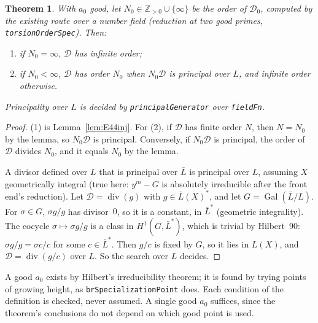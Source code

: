 \documentclass[11pt]{article}
\newtheorem{theorem}{Theorem}[section]
\theoremstyle{definition}
\theoremstyle{remark}
\newcommand{\Z}{\mathbb{Z}}
\newcommand{\code}[1]{\texttt{#1}}
\begin{document}
\begin{theorem}\label{thm:E44tors}
With $a_0$ good, let $N_0\in\Z_{>0}\cup\{\infty\}$ be the order of $\mathcal D_0$,
computed by the existing route over a number field (reduction at two good primes,
\code{torsionOrderSpec}). Then:
\begin{enumerate}
\item if $N_0=\infty$, $\mathcal D$ has infinite order;
\item if $N_0<\infty$, $\mathcal D$ has order $N_0$ when $N_0\mathcal D$ is principal
  over $L$, and infinite order otherwise.
\end{enumerate}
Principality over $L$ is decided by \code{principalGenerator} over \code{fieldFn}.
\end{theorem}
\begin{proof}
(1) is Lemma~\ref{lem:E44inj}. For (2), if $\mathcal D$ has finite order $N$, then
$N=N_0$ by the lemma, so $N_0\mathcal D$ is principal. Conversely, if $N_0\mathcal D$ is
principal, the order of $\mathcal D$ divides $N_0$, and it equals $N_0$ by the lemma.

A divisor defined over $L$ that is principal over $\bar L$ is principal over $L$,
assuming $X$ geometrically integral (true here: $y^m-G$ is absolutely irreducible
after the front end's reduction). Let $\mathcal D=\operatorname{div}(g)$ with $g\in\bar
L(X)^*$, and let $G=\operatorname{Gal}(\bar L/L)$. For $\sigma\in G$, $\sigma g/g$ has
divisor~$0$, so it is a constant, in $\bar L^*$ (geometric integrality). The cocycle
$\sigma\mapsto\sigma g/g$ is a class in $H^1(G,\bar L^*)$, which is trivial by
Hilbert~90: $\sigma g/g=\sigma c/c$ for some $c\in\bar L^*$. Then $g/c$ is fixed by
$G$, so it lies in $L(X)$, and $\mathcal D=\operatorname{div}(g/c)$ over $L$. So the
search over $L$ decides.
\end{proof}

\noindent A good $a_0$ exists by Hilbert's irreducibility theorem; it is found by trying
points of growing height, as \code{brSpecializationPoint} does. Each condition of the
definition is checked, never assumed. A single good $a_0$ suffices, since the
theorem's conclusions do not depend on which good point is used.
\end{document}
